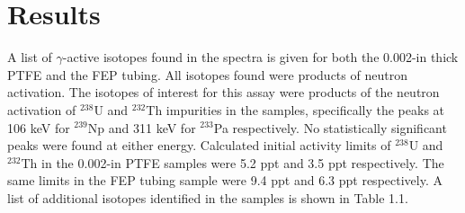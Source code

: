 




\section{Results}

A list of $\gamma$-active isotopes found in the spectra is given for both the 0.002-in thick PTFE and the FEP tubing.  All isotopes found were products of neutron activation.  The isotopes of interest for this assay were products of the neutron activation of $^{238}$U and $^{232}$Th impurities in the samples, specifically the peaks at 106 keV for $^{239}$Np and 311 keV
for $^{233}$Pa respectively.  No statistically significant peaks were found at either energy.  Calculated initial activity limits of $^{238}$U and $^{232}$Th in the 0.002-in PTFE samples were 5.2 ppt and 3.5 ppt respectively.  The same limits in the FEP tubing sample were 9.4 ppt and 6.3 ppt respectively.  A list of additional isotopes identified in the samples is shown in Table 1.1.



